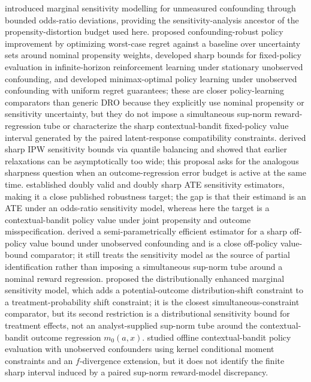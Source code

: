 \documentclass[11pt]{article}
\theoremstyle{definition}
\theoremstyle{plain}
\theoremstyle{remark}
\begin{document}
\citet{Tan2006} introduced marginal sensitivity modelling for unmeasured confounding through bounded odds-ratio deviations, providing the sensitivity-analysis ancestor of the propensity-distortion budget used here. \citet{KallusZhou2018} proposed confounding-robust policy improvement by optimizing worst-case regret against a baseline over uncertainty sets around nominal propensity weights, \citet{KallusZhou2020} developed sharp bounds for fixed-policy evaluation in infinite-horizon reinforcement learning under stationary unobserved confounding, and \citet{KallusZhou2021} developed minimax-optimal policy learning under unobserved confounding with uniform regret guarantees; these are closer policy-learning comparators than generic DRO because they explicitly use nominal propensity or sensitivity uncertainty, but they do not impose a simultaneous sup-norm reward-regression tube or characterize the sharp contextual-bandit fixed-policy value interval generated by the paired latent-response compatibility constraints. \citet{DornGuo2023} derived sharp IPW sensitivity bounds via quantile balancing and showed that earlier relaxations can be asymptotically too wide; this proposal asks for the analogous sharpness question when an outcome-regression error budget is active at the same time. \citet{DornGuoKallus2025} established doubly valid and doubly sharp ATE sensitivity estimators, making it a close published robustness target; the gap is that their estimand is an ATE under an odds-ratio sensitivity model, whereas here the target is a contextual-bandit policy value under joint propensity and outcome misspecification. \citet{HessFrauenMelnychukFeuerriegel2026} derived a semi-parametrically efficient estimator for a sharp off-policy value bound under unobserved confounding and is a close off-policy value-bound comparator; it still treats the sensitivity model as the source of partial identification rather than imposing a simultaneous sup-norm tube around a nominal reward regression. \citet{ZhangXuTan2025} proposed the distributionally enhanced marginal sensitivity model, which adds a potential-outcome distribution-shift constraint to a treatment-probability shift constraint; it is the closest simultaneous-constraint comparator, but its second restriction is a distributional sensitivity bound for treatment effects, not an analyst-supplied sup-norm tube around the contextual-bandit outcome regression $m_0(a,x)$. \citet{IshikawaHe2023} studied offline contextual-bandit policy evaluation with unobserved confounders using kernel conditional moment constraints and an $f$-divergence extension, but it does not identify the finite sharp interval induced by a paired sup-norm reward-model discrepancy.
\end{document}

